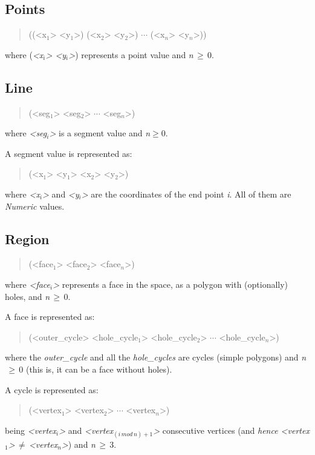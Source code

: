 \documentclass[english,a4paper]{article}
\begin{document}
\subsection{Points}

\begin{quotation}
((<x$_{1}$> <y$_{1}$>) (<x$_{2}$> <y$_{2}$>) $\cdots $ (<x$_{n}$>
<y$_{n}$>))
\end{quotation}
where (\emph{<x$_{i}$> <y$_{i}$>}) represents a point value and
\emph{n}$\, \geq \, $0.


\subsection{Line}

\begin{quotation}
(<seg$_{1}$> <seg$_{2}$> $\cdots $ <seg$_{n}$>)
\end{quotation}
where \emph{<seg$_{i}$>} is a segment value and \emph{n}$\geq $0.

A segment value is represented as:

\begin{quotation}
(<x$_{1}$> <y$_{1}$> <x$_{2}$> <y$_{2}$>)
\end{quotation}
where \emph{<x$_{i}$>} and \emph{<y$_{i}$>} are the coordinates
of the end point \emph{i}. All of them are \emph{Numeric} values.


\subsection{Region}

\begin{quotation}
(<face$_{1}$> <face$_{2}$> <face$_{n}$>)
\end{quotation}
where \emph{<face$_{i}$>} represents a face in the space, as a polygon
with (optionally) holes, and \emph{n}$\, \geq \, $0.

A face is represented as:

\begin{quotation}
(<outer\_cycle> <hole\_cycle$_{1}$> <hole\_cycle$_{2}$> $\cdots $
<hole\_cycle$_{n}$>)
\end{quotation}
where the \emph{outer\_cycle} and all the \emph{hole\_cycles} are
cycles (simple polygons) and \emph{n}$\, \geq \, $0 (this is, it
can be a face without holes).

A cycle is represented as:

\begin{quotation}
(<vertex$_{1}$> <vertex$_{2}$> $\cdots $ <vertex$_{n}$>)
\end{quotation}
being \emph{<vertex$_{i}$>} and \emph{<vertex$_{(i\, mod\, n)+1}$>}
consecutive vertices (and \emph{hence <vertex$_{1}$>}$\, \neq \, $\emph{<vertex$_{n}$>})
and \emph{n}$\, \geq \, $3.
\end{document}
